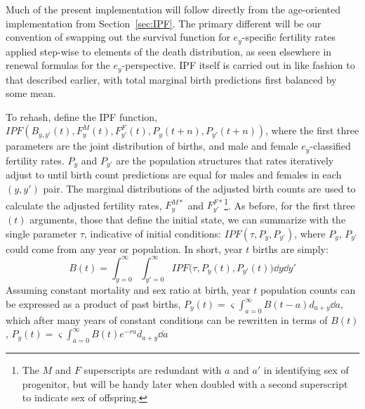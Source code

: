 
Much of the present implementation will follow directly from the age-oriented
implementation from Section~\ref{sec:IPF}. The primary different will be our
convention of swapping out the survival function for $e_y$-specific fertility
rates applied step-wise to elements of the death distribution, as seen elsewhere
in renewal formulas for the $e_y$-perspective. IPF itself is carried out in like
fashion to that described earlier, with total marginal birth predictions
first balanced by some mean. 

To rehash, define the IPF function,
$IPF(B_{y,y'}(t), F_y^M(t), F_{y'}^F(t),P_y(t+n),P_{y'}(t+n))$, where the first
three parameters are the joint distribution of births, and male and female
$e_y$-classified fertility rates. $P_y$ and $P_{y'}$ are the population
structures that rates iteratively adjust to until birth count predictions are
equal for males and females in each $(y,y')$ pair. The marginal distributions of
the adjusted birth counts are used to calculate the adjusted fertility rates,
$F_y^{M\ast}$ and $F_{y'}^{F\ast}$\footnote{The $M$ and $F$ superscripts are
redundant with $a$ and $a'$ in identifying sex of progenitor, but will be handy
later when doubled with a second superscript to indicate sex of offspring.}. As
before, for the first three $(t)$ arguments, those that define the initial
state, we can summarize with the single parameter $\tau$, indicative of initial
conditions: $IPF(\tau,P_y, P_{y'})$, where $P_y$, $P_{y'}$ could come from any
year or population. In short, year $t$ births are simply:
\begin{equation}
B(t) = \int _{y=0}^\infty \int _{y'=0}^\infty IPF\Big(\tau,P_y(t),
P_{y'}(t)\Big) \dd y \dd y'
\end{equation}
Assuming constant mortality and sex ratio at birth, year $t$ population counts
can be expressed as a product of past births, $P_y(t) =
\varsigma \int_{a=0}^\infty B(t-a)d_{a+y} \dd a$, which after many years of
constant conditions can be rewritten in terms of $B(t)$, $P_y(t) =
\varsigma \int_{a=0}^\infty B(t)e^{-ra}d_{a+y} \dd a$

